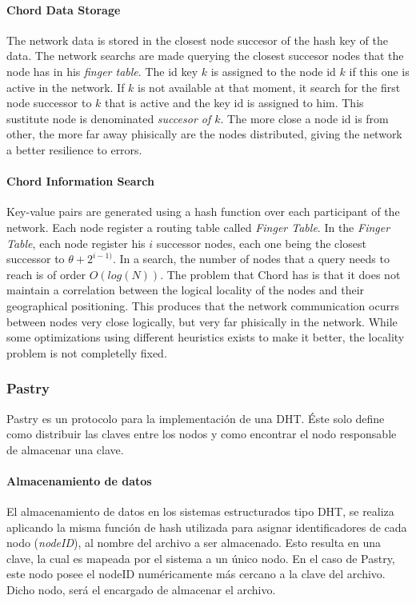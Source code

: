 \paragraph{Chord Data Storage}
The network data is stored in the closest node succesor of the hash key of the
data. The network searchs are made querying the closest succesor
nodes that the node has in his \textit{finger table}.
The id key $k$ is assigned to the node id $k$ if this one is active in the
network. If $k$ is not available at that moment, it search for the first node
successor to $k$ that is active and the key id is assigned to him. This
sustitute node is denominated \textit{succesor of $k$}.
The more close a node id is from other, the more far away phisically are the
nodes distributed, giving the network a better resilience to errors.

\paragraph{Chord Information Search}
Key-value pairs are generated using a hash function over each participant of
the network.  Each node register a routing table called \textit{Finger Table}.
In the \textit{Finger Table}, each node register his $i$ successor nodes, each
one being the closest successor to $\theta + 2^{i-1)}$. 
In a search, the number of nodes that a query needs to reach is of order
$O(log(N))$.
The problem that Chord has is that it does not maintain a correlation
between the logical locality of the nodes and their geographical positioning. This
produces that the network communication ocurrs between nodes very close
logically, but very far phisically in the network. While some
optimizations using different heuristics exists to make it better, the locality
problem is not completelly fixed.

\subsubsection{Pastry}
\label{sec:pastry}
Pastry es un protocolo para la implementación de una DHT. Éste solo define como
distribuir las claves entre los nodos y como encontrar el nodo responsable de almacenar una clave.

\paragraph{Almacenamiento de datos}

El almacenamiento de datos en los sistemas estructurados tipo DHT, se realiza
aplicando la misma función de hash utilizada para asignar identificadores de
cada nodo (\textit{nodeID}), al nombre del archivo a ser almacenado. Esto resulta en una
clave, la cual es mapeada por el sistema a un único nodo. En el caso de Pastry,
este nodo posee el nodeID numéricamente más cercano a la clave del archivo.
Dicho nodo, será el encargado de almacenar el archivo.

